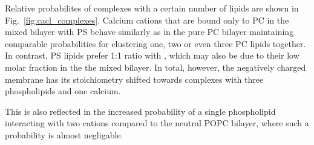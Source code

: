 Relative probabilites of  complexes with a certain number of lipids are shown in Fig.~\ref{fig:cacl_complexes}. 
Calcium cations that are bound only to PC in the mixed bilayer with PS 
behave similarly as in the pure PC bilayer
maintaining comparable probabilities for clustering one, two or even three PC lipids together. 
In contrast, PS lipids prefer 1:1 ratio with ,
which may also be due to their low molar fraction in the the mixed bilayer. 
In total, however, the negatively charged membrane has its stoichiometry 
shifted towards complexes with three phospholipids and one calcium. 

This is also reflected in the increased probability 
of a single phospholipid interacting with two  cations 
compared to the neutral POPC bilayer, 
where such a probability is almost negligable. 









 
 
 









